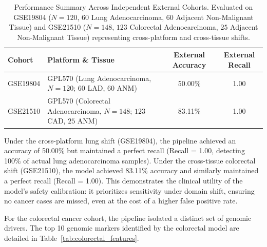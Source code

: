 \documentclass[journal,10pt]{IEEEtran}
\begin{document}
\begin{table}[htbp]
\centering
\caption{Performance Summary Across Independent External Cohorts. Evaluated on GSE19804 ($N=120$, $60$ Lung Adenocarcinoma, $60$ Adjacent Non-Malignant Tissue) and GSE21510 ($N=148$, $123$ Colorectal Adenocarcinoma, $25$ Adjacent Non-Malignant Tissue) representing cross-platform and cross-tissue shifts.}
\label{tab:external_validation}
\begin{tabular}{llcc}
\toprule
\textbf{Cohort} & \textbf{Platform \& Tissue} & \textbf{External Accuracy} & \textbf{External Recall} \\
\midrule
GSE19804 & GPL570 (Lung Adenocarcinoma, $N=120$; $60$ LAD, $60$ ANM) & 50.00\% & 1.00 \\
GSE21510 & GPL570 (Colorectal Adenocarcinoma, $N=148$; $123$ CAD, $25$ ANM) & 83.11\% & 1.00 \\
\bottomrule
\end{tabular}
\end{table}

Under the cross-platform lung shift (GSE19804), the pipeline achieved an accuracy of 50.00\% but maintained a perfect recall (Recall = 1.00, detecting 100\% of actual lung adenocarcinoma samples). Under the cross-tissue colorectal shift (GSE21510), the model achieved 83.11\% accuracy and similarly maintained a perfect recall (Recall = 1.00). This demonstrates the clinical utility of the model's safety calibration: it prioritizes sensitivity under domain shift, ensuring no cancer cases are missed, even at the cost of a higher false positive rate.

For the colorectal cancer cohort, the pipeline isolated a distinct set of genomic drivers. The top 10 genomic markers identified by the colorectal model are detailed in Table~\ref{tab:colorectal_features}.
\end{document}

